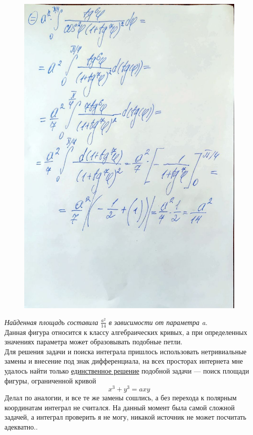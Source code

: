 \documentclass[a4paper,12pt]{article}
\begin{document}
\begin{figure}[H]
    \centering
    \includegraphics[width=0.75\linewidth]{../img/4_2.jpg}
    \caption{}
    \label{fig:part1}
\end{figure}

\emph{Найденная площадь составила} \( \frac{a^2}{14} \) \emph{в зависимости от параметра a}.\\
Данная фигура относится к классу алгебраических кривых, а при определенных
значениях параметра может образовывать подобные петли.\\
Для решения задачи и поиска интеграла пришлось использовать нетривиальные
замены и внесение под знак дифференциала, на всех просторах интернета
мне удалось найти только \href{https://primat.org/publ/reshennye_zadachi/vychislenie_ploskoj_figury/43-1-0-775}{единственное решение} подобной задачи --- поиск
площади фигуры, ограниченной кривой \[x^3 + y^3 = axy\]
Делал по аналогии, и все те же замены сошлись, а без перехода к полярным
координатам интеграл не считался. На данный момент была самой сложной задачей, а интеграл проверить я не могу, никакой источник не может посчитать адекватно..
\end{document}
